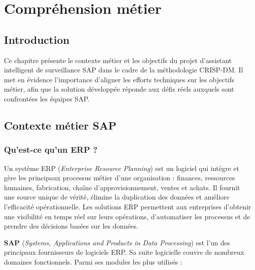 
\chapter{Compréhension métier}
\label{chap:business_understanding}

\section*{Introduction}

Ce chapitre présente le contexte métier et les objectifs du projet d'assistant
intelligent de surveillance SAP dans le cadre de la méthodologie CRISP-DM. Il met en
évidence l'importance d'aligner les efforts techniques sur les objectifs métier, afin
que la solution développée réponde aux défis réels auxquels sont confrontées les équipes SAP.

\section{Contexte métier SAP}
\label{sec:contexte_sap}

\subsection{Qu'est-ce qu'un ERP ?}

Un système ERP (\textit{Enterprise Resource Planning}) est un logiciel qui intègre et
gère les principaux processus métier d'une organisation : finances, ressources humaines,
fabrication, chaîne d'approvisionnement, ventes et achats. Il fournit une source unique
de vérité, élimine la duplication des données et améliore l'efficacité opérationnelle.
Les solutions ERP permettent aux entreprises d'obtenir une visibilité en temps réel sur
leurs opérations, d'automatiser les processus et de prendre des décisions basées sur
les données.

\textbf{SAP} (\textit{Systems, Applications and Products in Data Processing}) est l'un
des principaux fournisseurs de logiciels ERP. Sa suite logicielle couvre de nombreux
domaines fonctionnels. Parmi ses modules les plus utilisés :

